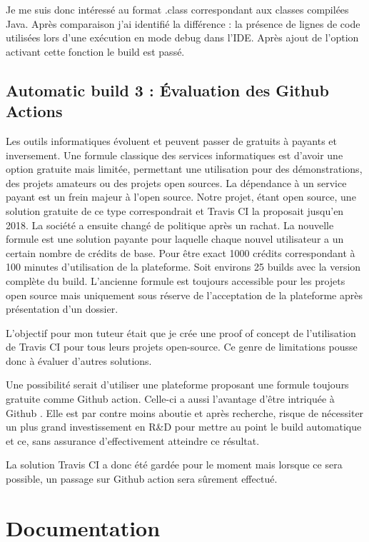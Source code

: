 \documentclass[french,a4paper,12pt]{report}
\begin{document}
Je me suis donc intéressé au format .class correspondant aux classes compilées Java. 
Après comparaison j’ai identifié la différence : la présence de lignes de code utilisées lors d'une exécution en mode debug dans l’IDE. Après ajout de l’option activant cette fonction le build est passé.

\subsection{Automatic build 3 : Évaluation des Github Actions}

Les outils informatiques évoluent et peuvent passer de gratuits à payants et inversement. Une formule classique des services informatiques est d’avoir une option gratuite mais limitée, permettant une utilisation pour des démonstrations, des projets amateurs ou des projets open sources. La dépendance à un service payant est un frein majeur à l’open source. Notre projet, étant open source, une solution gratuite de ce type correspondrait et Travis CI la proposait jusqu’en 2018. La société a ensuite changé de politique après un rachat. La nouvelle formule est une solution payante pour laquelle chaque nouvel utilisateur a un certain nombre de crédits de base. Pour être exact 1000 crédits correspondant à 100 minutes d’utilisation de la plateforme. Soit environs 25 builds avec la version complète du build. L'ancienne formule est toujours accessible pour les projets open source mais uniquement sous réserve de l'acceptation de la plateforme après présentation d'un dossier.

L’objectif pour mon tuteur était que je crée une proof of concept de l’utilisation de Travis CI pour tous leurs projets open-source. Ce genre de limitations pousse donc à évaluer d'autres solutions.

Une possibilité serait d’utiliser une plateforme proposant une formule toujours gratuite comme Github action. Celle-ci a aussi l’avantage d’être intriquée à Github . Elle est par contre moins aboutie et après recherche, risque de nécessiter un plus grand investissement en R\&D pour mettre au point le build automatique et ce, sans assurance d’effectivement atteindre ce résultat.

La solution Travis CI a donc été gardée pour le moment mais lorsque ce sera possible, un passage sur Github action sera sûrement effectué.

\section{Documentation}
\end{document}
